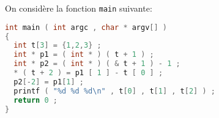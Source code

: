 
\begin{center}
\end{center}

On considère la fonction \texttt{main} suivante:

\begin{lstlisting}[language=C]
int main ( int argc , char * argv[] )
{
  int t[3] = {1,2,3} ;
  int * p1 = ( int * ) ( t + 1 ) ;
  int * p2 = ( int * ) ( & t + 1 ) - 1 ;
  * ( t + 2 ) = p1 [ 1 ] - t [ 0 ] ;
  p2[-2] = p1[1] ;
  printf ( "%d %d %d\n" , t[0] , t[1] , t[2] ) ;
  return 0 ;
}
\end{lstlisting}

